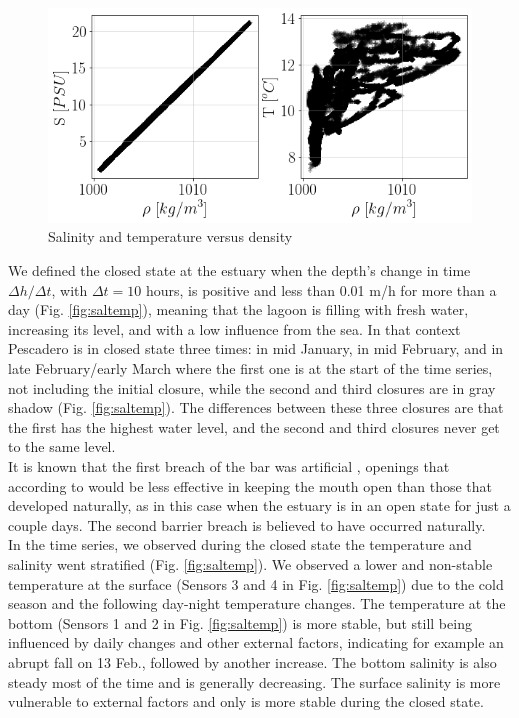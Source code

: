 \documentclass[tesis.tex]{subfiles}
\begin{document}
\begin{figure}[h!]
  \centering
  \includegraphics[scale=0.5]{Imagenes/salT_dens.png}
  \caption{Salinity and temperature versus density}
  \label{fig:saltdens}
\end{figure}

We defined the closed state at the estuary when the depth's change in time $\Delta h/\Delta t$, with $\Delta t=10$ hours, is positive and less than 0.01 m/h for more than a day (Fig. \ref{fig:saltemp}), meaning that the lagoon is filling with fresh water, increasing its level, and with a low influence from the sea. In that context Pescadero is in closed state three times: in mid January, in mid February, and in late February/early March where the first one is at the start of the time series, not including the initial closure, while the second and third closures are in gray shadow (Fig. \ref{fig:saltemp}). The differences between these three closures are that the first has the highest water level, and the second and third closures never get to the same level. \\

It is known that the first breach of the bar was artificial \citep{Williams2014}, openings that according to \cite{Behrens2013} would be less effective in keeping the mouth open than those that developed naturally, as in this case when the estuary is in an open state for just a couple days. The second barrier breach is believed to have occurred naturally. \\

In the time series, we observed during the closed state the temperature and salinity went stratified (Fig. \ref{fig:saltemp}). We observed a lower and non-stable temperature at the surface (Sensors 3 and 4 in Fig. \ref{fig:saltemp}) due to the cold season and the following day-night temperature changes. The temperature at the bottom (Sensors 1 and 2 in Fig. \ref{fig:saltemp}) is more stable, but still being influenced by daily changes and other external factors, indicating for example an abrupt fall on 13 Feb., followed by another increase. The bottom salinity is also steady most of the time and is generally decreasing. The surface salinity is more vulnerable to external factors and only is more stable during the closed state. \\ 
\end{document}
